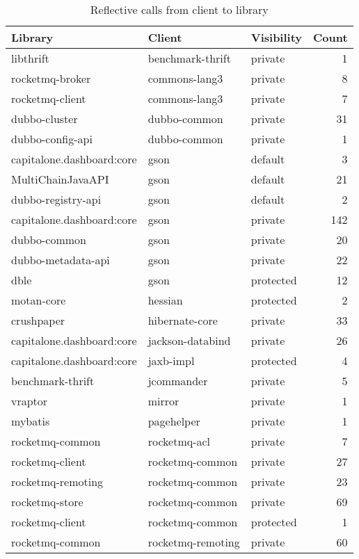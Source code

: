 \begin{table}[ht]
\centering
\caption{\label{tab:refl-inv}Reflective calls from client to library} 
\begingroup\small
\begin{tabular}{lllr}
  \hline
Library & Client & Visibility & Count \\ 
  \hline
libthrift & benchmark-thrift & private & 1 \\ 
  rocketmq-broker & commons-lang3 & private & 8 \\ 
  rocketmq-client & commons-lang3 & private & 7 \\ 
  dubbo-cluster & dubbo-common & private & 31 \\ 
  dubbo-config-api & dubbo-common & private & 1 \\ 
  capitalone.dashboard:core & gson & default & 3 \\ 
  MultiChainJavaAPI & gson & default & 21 \\ 
  dubbo-registry-api & gson & default & 2 \\ 
  capitalone.dashboard:core & gson & private & 142 \\ 
  dubbo-common & gson & private & 20 \\ 
  dubbo-metadata-api & gson & private & 22 \\ 
  dble & gson & protected & 12 \\ 
  motan-core & hessian & protected & 2 \\ 
  crushpaper & hibernate-core & private & 33 \\ 
  capitalone.dashboard:core & jackson-databind & private & 26 \\ 
  capitalone.dashboard:core & jaxb-impl & protected & 4 \\ 
  benchmark-thrift & jcommander & private & 5 \\ 
  vraptor & mirror & private & 1 \\ 
  mybatis & pagehelper & private & 1 \\ 
  rocketmq-common & rocketmq-acl & private & 7 \\ 
  rocketmq-client & rocketmq-common & private & 27 \\ 
  rocketmq-remoting & rocketmq-common & private & 23 \\ 
  rocketmq-store & rocketmq-common & private & 69 \\ 
  rocketmq-client & rocketmq-common & protected & 1 \\ 
  rocketmq-common & rocketmq-remoting & private & 60 \\ 

\end{tabular}
\end{table}
